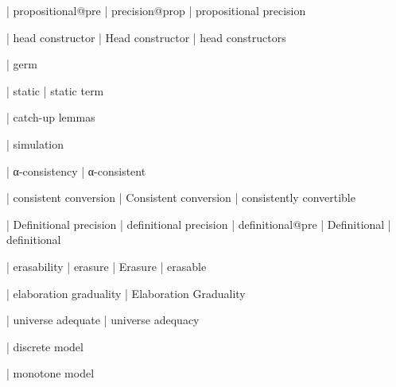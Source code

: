   | propositional@pre
  | precision@prop
  | propositional precision


 | head constructor
 | Head constructor
 | head constructors

  | germ

  | static
  | static term

  | catch-up lemmas

  | simulation

  | α-consistency
  | α-consistent

  | consistent conversion
  | Consistent conversion
  | consistently convertible

  | Definitional precision
  | definitional precision
  | definitional@pre
  | Definitional
  | definitional

  | erasability
  | erasure
  | Erasure
  | erasable

  | elaboration graduality
  | Elaboration Graduality

  | universe adequate
  | universe adequacy

  | discrete model

  | monotone model
